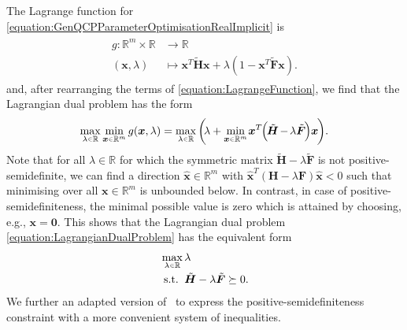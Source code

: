 \documentclass[10pt,conference]{IEEEtran}
\newcommand*{\R}{\mathbb{R}}          %
\newcommand*{\transpose}{T}           %
\newcommand*{\scriptin}{\raisebox{0.15ex}{$\scriptscriptstyle \in$}}
\newcommand*{\deepscriptin}{\raisebox{0.1ex}{$\scriptscriptstyle \in$}}
\newcommand*{\mathhphantomdisplay}[2]{\mathmakebox[\widthof{$\displaystyle #1$}][l]{#2}}
\begin{document}
The Lagrange function for \eqref{equation:GenQCPParameterOptimisationRealImplicit} is
\begin{align}\label{equation:LagrangeFunction}
    \begin{split}
        g : \R^{m} \times \R &\rightarrow \R \\
        (\bm{x}, \lambda) &\mapsto \bm{x}^{\transpose} \tilde{\bm{H}} \bm{x} + \lambda (1 - \bm{x}^{\transpose} \tilde{\bm{F}} \bm{x}).
    \end{split}
\end{align}
and, after rearranging the terms of \eqref{equation:LagrangeFunction}, we find that the Lagrangian dual problem has the form
\begin{align}\label{equation:LagrangianDualProblem}
    \max_{\lambda \scriptin \R} \min_{\bm{x} \deepscriptin \R^{m}} g(\bm{x}, \lambda) = \max_{\lambda \scriptin \R} \bigg(\hspace*{-2pt}\lambda + \min_{\bm{x} \deepscriptin \R^{m}}\hspace*{-1pt} \bm{x}^{\transpose}\hspace*{-1pt} \Big(\hspace*{-1pt}\tilde{\bm{H}}\hspace*{-1pt} -\hspace*{-1pt} \lambda \tilde{\bm{F}}\hspace*{-1pt}\Big) \bm{x}\hspace*{-1pt}\bigg).
\end{align}
Note that for all $\lambda \in \R$ for which the symmetric matrix $\tilde{\bm{H}} - \lambda \tilde{\bm{F}}$ is not positive-semidefinite, we can find a direction $\hat{\bm{x}} \in \R^{m}$ with $\hat{\bm{x}}^{\transpose} (\bm{H} - \lambda \bm{F}) \hat{\bm{x}} < 0$ such that minimising over all $\bm{x} \in \R^{m}$ is unbounded below.
In contrast, in case of positive-semidefiniteness, the minimal possible value is zero which is attained by choosing, e.g., $\bm{x} = \bm{0}$.
This shows that the Lagrangian dual problem \eqref{equation:LagrangianDualProblem} has the equivalent form
\begin{align}\label{equation:ConstrainedLagrangianDualProblem}
    \begin{split}
        &\max_{\lambda \scriptin \R} \lambda \\
        &\mathhphantomdisplay{\max_{\lambda \scriptin \R}}{\ \text{s.t. }}\ \tilde{\bm{H}} - \lambda \tilde{\bm{F}} \succeq 0.
    \end{split}
\end{align}
We further an adapted version of~\cite[Lemma 2.1]{Nguyen2022StrongDualityForGeneralQuadraticProgramsWithQuadraticEqualityConstraints} to express the positive-semidefiniteness constraint with a more convenient system of inequalities.
\end{document}
